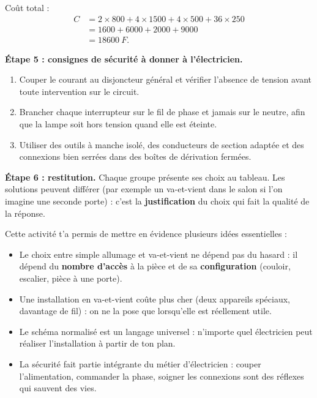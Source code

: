 \documentclass[11pt]{article}
\newcounter{popsec}
\newcounter{popsub}
\newcommand{\courssub}[1]{%
  \stepcounter{popsub}%
  \par\vspace{9pt}\noindent{\popxbold\fontsize{11.5}{13}\selectfont\color{popink}{\color{poporange}\thepopsec.\thepopsub}\hspace{6pt}#1}\par\nopagebreak\vspace{4pt}
}
\begin{document}
\begin{exoresolu}
Coût total :
\begin{align*}
C &= 2 \times 800 + 4 \times 1500 + 4 \times 500 + 36 \times 250 \\
  &= 1600 + 6000 + 2000 + 9000 \\
  &= \SI{18600}{F}.
\end{align*}

\textbf{Étape 5 : consignes de sécurité à donner à l'électricien.}

\begin{enumerate}
\item Couper le courant au disjoncteur général et vérifier l'absence de tension avant toute intervention sur le circuit.
\item Brancher chaque interrupteur sur le fil de phase et jamais sur le neutre, afin que la lampe soit hors tension quand elle est éteinte.
\item Utiliser des outils à manche isolé, des conducteurs de section adaptée et des connexions bien serrées dans des boîtes de dérivation fermées.
\end{enumerate}

\textbf{Étape 6 : restitution.} Chaque groupe présente ses choix au tableau. Les solutions peuvent différer (par exemple un va-et-vient dans le salon si l'on imagine une seconde porte) : c'est la \textbf{justification} du choix qui fait la qualité de la réponse.
\end{exoresolu}

\courssub{Bilan de l'activité}

Cette activité t'a permis de mettre en évidence plusieurs idées essentielles :

\begin{itemize}
\item Le choix entre simple allumage et va-et-vient ne dépend pas du hasard : il dépend du \textbf{nombre d'accès} à la pièce et de sa \textbf{configuration} (couloir, escalier, pièce à une porte).
\item Une installation en va-et-vient coûte plus cher (deux appareils spéciaux, davantage de fil) : on ne la pose que lorsqu'elle est réellement utile.
\item Le schéma normalisé est un langage universel : n'importe quel électricien peut réaliser l'installation à partir de ton plan.
\item La sécurité fait partie intégrante du métier d'électricien : couper l'alimentation, commander la phase, soigner les connexions sont des réflexes qui sauvent des vies.
\end{itemize}
\end{document}
